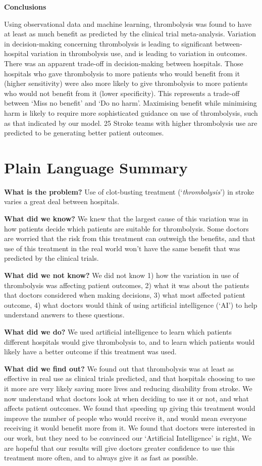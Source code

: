 \textbf{Conclusions}

Using observational data and machine learning, thrombolysis was found to have at least as much benefit as predicted by the clinical trial meta-analysis. Variation in decision-making concerning thrombolysis is leading to significant between-hospital variation in thrombolysis use, and is leading to variation in outcomes. There was an apparent trade-off in decision-making between
hospitals. Those hospitals who gave thrombolysis to more patients who would benefit from it (higher sensitivity) were
also more likely to give thrombolysis to more patients who would not benefit from it (lower specificity). This represents
a trade-off between ‘Miss no benefit’ and ‘Do no harm’. Maximising benefit while minimising harm is likely to require
more sophisticated guidance on use of thrombolysis, such as that indicated by our model.
25
Stroke teams with higher thrombolysis use are predicted to be generating better patient outcomes. 

\section*{Plain Language Summary}

\textbf{What is the problem?} Use of clot-busting treatment (`\textit{thrombolysis}') in stroke varies a great deal between hospitals.

\textbf{What did we know?} We knew that the largest cause of this variation was in how patients decide which patients are suitable for thrombolysis. Some doctors are worried that the risk from this treatment can outweigh the benefits, and that use of this treatment in the real world won’t have the same benefit that was predicted by the clinical trials.

\textbf{What did we not know?} We did not know 1) how the variation in use of thrombolysis was affecting patient outcomes, 2) what it was about the patients that doctors considered when making decisions, 3) what most affected patient outcome, 4) what doctors would think of using artificial intelligence (`AI') to help understand answers to these questions.

\textbf{What did we do?} We used artificial intelligence to learn which patients different hospitals would give thrombolysis to, and to learn which patients would likely have a better outcome if this treatment was used.

\textbf{What did we find out?} We found out that thrombolysis was at least as effective in real use as clinical trials predicted, and that hospitals choosing to use it more are very likely saving more lives and reducing disability from stroke. We now understand what doctors look at when deciding to use it or not, and what affects patient outcomes. We  found that speeding up giving this treatment would improve the number of people who would receive it, and would mean everyone receiving it would benefit more from it. We found that doctors were interested in our work, but they need to be convinced our ‘Artificial Intelligence’ is right, We are hopeful that our results will give doctors greater confidence to use this treatment more often, and to always give it as fast as possible.